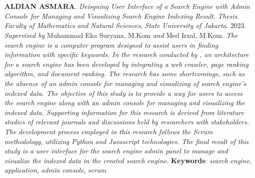 \chapter*{}

\begin{spacing}{1}
	\textbf{ALDIAN ASMARA}. \emph{Deisgning User Interface of a Search Engine with Admin Console for Managing and Visualizing Search Engine Indexing Result}. \emph{Thesis}. \emph{Faculty of Mathematics and Natural Sciences}, \emph{State University of Jakarta}. 2023. \emph{Supervised by} Muhammad Eka Suryana, M.Kom \emph{and} Med Irzal, M.Kom.
	\newline
	\newline
	\textit{The search engine is a computer program designed to assist users in finding information with specific keywords. In the research conducted by \citep{lazu}, an architecture for a search engine has been developed by integrating a web crawler, page ranking algorithm, and document ranking. The research has some shortcomings, such as the absence of an admin console for managing and visualizing of search engine's indexed data. The objective of this study is to provide a way for users to access the search engine along with an admin console for managing and visualizing the indexed data. Supporting information for this research is derived from literature studies of relevant journals and discussions held by researchers with stakeholders. The development process employed in this research follows the Scrum methodology, utilizing Python and Javascript technologies. The final result of this study is a user interface for the search engine admin panel to manage and visualize the indexed data in the created search engine. }
	\newline
	\newline
	\noindent \textbf{Keywords}: \textit{search engine}, \textit{application}, \textit{admin console}, \textit{scrum}
\end{spacing}

